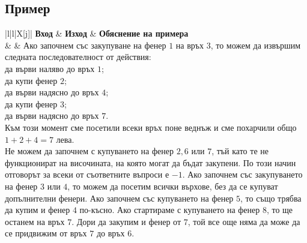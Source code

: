 \documentclass[12pt]{article}
\begin{document}
\subsection{Пример}
\begin{table}[H]
	\begin{tblr}{|l|l|X[j]|}
		\hline
		\textbf{Вход} & \textbf{Изход} & \textbf{Обяснение на примера} \\
		\hline
		\texttt{}
		& 
		\texttt{}
		& 
		{Ако започнем със закупуване на фенер $1$ на връх $3$, то можем да извършим следната последователност от действия:\\
		\indent\tabitem да върви наляво до връх $1$;\\
		\indent\tabitem да купи фенер $2$;\\
		\indent\tabitem да върви надясно до връх $4$;\\
		\indent\tabitem да купи фенер $3$;\\
		\indent\tabitem да върви надясно до връх $7$.\\
		Към този момент сме посетили всеки връх поне веднъж и сме похарчили общо $1+2+4=7$ лева.\\
		Не можем да започнем с купуването на фенер $2, 6$ или $7$, тъй като те не функционират на височината, на която могат да бъдат закупени. По този начин отговорът за всеки от съответните въпроси е $-1$. Ако започнем със закупуването на фенер $3$ или $4$, то можем да посетим всички върхове, без да се купуват допълнителни фенери. Ако започнем със купуването на фенер $5$, то също трябва да купим и фенер $4$ по-късно. Ако стартираме с купуването на фенер $8$, то ще останем на връх $7$. Дори да закупим и фенер от $7$, той все още няма да може да се придвижим от връх $7$ до връх $6$.} \\
		\hline
	\end{tblr}
\end{table}
\FloatBarrier
	
\end{document}
